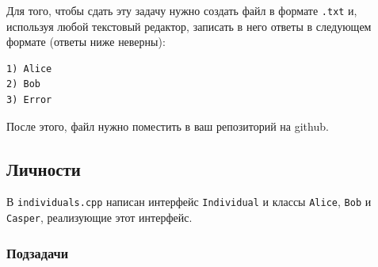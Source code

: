 \documentclass{article}
\begin{document}
\noindent Для того, чтобы сдать эту задачу нужно создать файл в формате \texttt{.txt} и, используя любой текстовый редактор, записать в него ответы в следующем формате (ответы ниже неверны):
\begin{verbatim}
1) Alice
2) Bob
3) Error
\end{verbatim} 
После этого, файл нужно поместить в ваш репозиторий на github.

\subsection{Личности} 
В \texttt{individuals.cpp} написан интерфейс \texttt{Individual} и классы \texttt{Alice}, \texttt{Bob} и \texttt{Casper}, реализующие этот интерфейс.
\subsubsection*{Подзадачи}
\end{document}
